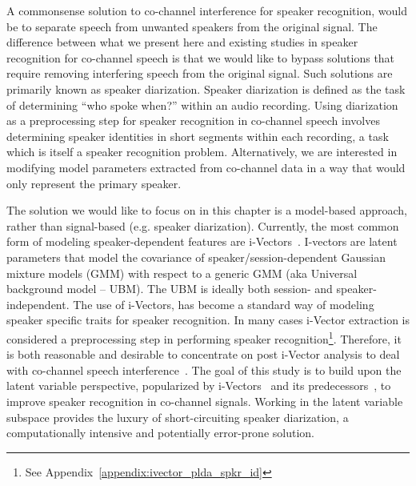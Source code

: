 A commonsense solution to co-channel interference for speaker recognition, would be to separate speech from unwanted speakers from the original signal. 
The difference between what we present here and existing studies in speaker recognition for co-channel speech is that we would like to bypass solutions that require removing interfering speech from the original signal. 
Such solutions are primarily known as speaker diarization. 
Speaker diarization is defined as the task of determining ``who spoke when?'' within an audio recording. 
Using diarization as a preprocessing step for speaker recognition in co-channel speech involves determining speaker identities in short segments within each recording, a task which is itself a speaker recognition problem.  
Alternatively, we are interested in modifying model parameters extracted from co-channel data in a way that would only represent the primary speaker. 

The solution we would like to focus on in this chapter is a model-based approach, rather than signal-based (e.g. speaker diarization). 
Currently, the most common form of modeling speaker-dependent features are i-Vectors~\cite{dehak2011front}. 
I-vectors are latent parameters that model the covariance of speaker/session-dependent Gaussian mixture models (GMM) with respect to a generic GMM (aka Universal background model -- UBM).  
The UBM is ideally both session- and speaker-independent.
The use of i-Vectors, has become a standard way of modeling speaker specific traits for speaker recognition. 
In many cases i-Vector extraction is considered a preprocessing step in performing speaker recognition\footnote{See Appendix~\ref{appendix:ivector_plda_spkr_id}}. 
Therefore, it is both reasonable and desirable to concentrate on post i-Vector analysis to deal with co-channel speech interference~\cite{ivector_challenge}. 
The goal of this study is to build upon the latent variable perspective, popularized by i-Vectors~\cite{dehak2011front} and its predecessors~\cite{kenny2010bayesian}, to improve speaker recognition in co-channel signals. 
Working in the latent variable subspace provides the luxury of short-circuiting speaker diarization, a computationally intensive and potentially error-prone solution. 


